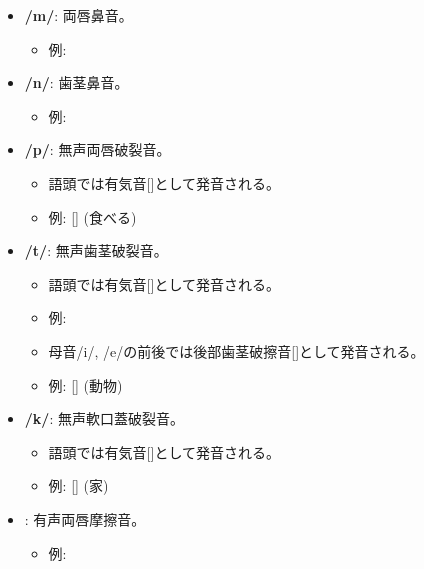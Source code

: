 \begin{itemize}
    \item \textbf{/m/}: 両唇鼻音。
    \begin{itemize}
        \item 例: %
    \end{itemize}

    \item \textbf{/n/}: 歯茎鼻音。
    \begin{itemize}
        \item 例: %
    \end{itemize}

    \item \textbf{/p/}: 無声両唇破裂音。
    \begin{itemize}
        \item 語頭では有気音[]として発音される。
        \item 例:  [] (食べる)
    \end{itemize}

    \item \textbf{/t/}: 無声歯茎破裂音。
    \begin{itemize}
        \item 語頭では有気音[]として発音される。
        \item 例: %
        \item 母音/i/, /e/の前後では後部歯茎破擦音[]として発音される。
        \item 例:  [] (動物)
    \end{itemize}

    \item \textbf{/k/}: 無声軟口蓋破裂音。
    \begin{itemize}
        \item 語頭では有気音[]として発音される。
        \item 例:  [] (家)
    \end{itemize}


    \item \textbf{}: 有声両唇摩擦音。
    \begin{itemize}
        \item 例: %
    \end{itemize}


\end{itemize}
